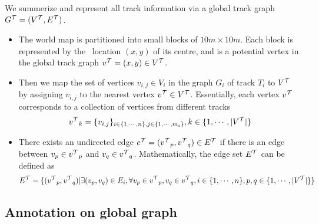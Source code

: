 We summerize and represent all track information via a global track graph ${G^{\mathcal{T}}}=({V^{\mathcal{T}}},{E^{\mathcal{T}}})$.
\begin{itemize}
	\item The world map is partitioned into small blocks of $10m\times10m$. Each block is represented by the \gps\ location $(x,y)$ of its centre, and is a potential vertex in the global track graph ${v^{\mathcal{T}}}=(x,y)\in{V^{\mathcal{T}}}$. 
	\item Then we map the set of vertices $v_{i,j}\in V_i$ in the graph $G_i$ of track $T_i$ to ${V^{\mathcal{T}}}$ by assigning $v_{i,j}$ to the nearest vertex ${v^{\mathcal{T}}}\in{V^{\mathcal{T}}}$. Essentially, each vertex ${v^{\mathcal{T}}}$ corresponds to a collection of vertices from different tracks
	\begin{align*}
		{v^{\mathcal{T}}}_k = \{v_{i,j}\}_{i\in\{1,\cdots,n\}, j\in\{1,\cdots,m_i\}}, k\in\{1,\cdots,|{V^{\mathcal{T}}}|\}
	\end{align*}
	\item There exists an undirected edge ${e^{\mathcal{T}}}=({v^{\mathcal{T}}}_p,{v^{\mathcal{T}}}_q)\in{E^{\mathcal{T}}}$ if there is an edge between $v_p\in{v^{\mathcal{T}}}_p$ and $v_q\in{v^{\mathcal{T}}}_q$. Mathematically, the edge set ${E^{\mathcal{T}}}$ can be defined as
	\begin{align*}
		{E^{\mathcal{T}}} = \{({v^{\mathcal{T}}}_p,{v^{\mathcal{T}}}_q)|\exists (v_p,v_q)\in E_i, \forall v_p\in{v^{\mathcal{T}}}_p,v_q\in{v^{\mathcal{T}}}_q, i\in\{1,\cdots,n\},p,q\in\{1,\cdots,|{V^{\mathcal{T}}}|\}\}
	\end{align*}
\end{itemize}




\subsection{Annotation on global graph}



